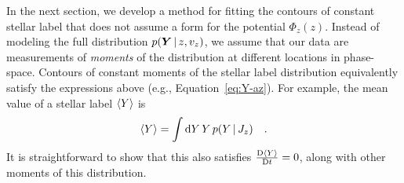 In the next section, we develop a method for fitting the contours of constant stellar
label that does not assume a form for the potential $\Phi_z(z)$.
Instead of modeling the full distribution $p(\boldsymbol{Y} \,|\, z, v_z)$, we assume that our
data are measurements of \emph{moments} of the distribution at different locations in
phase-space.
Contours of constant moments of the stellar label distribution equivalently satisfy the
expressions above (e.g., Equation~\ref{eq:Y-az}).
For example, the mean value of a stellar label $\left< Y \right>$ is
\begin{equation}
    \left< Y \right> = \int \mathrm{d} Y \, Y \, p(Y \,|\, J_z) \quad .
\end{equation}
It is straightforward to show that this also satisfies $\frac{\mathrm{D}{\left< Y \right>}}{\mathrm{D}{t}} = 0$, along
with other moments of this distribution.




